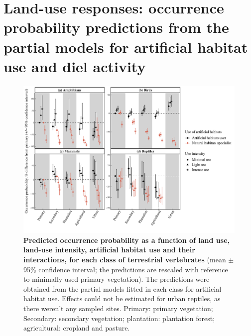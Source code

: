 \clearpage
\section{Land-use responses: occurrence probability predictions from the partial models for artificial habitat use and diel activity}

\begin{figure}[h!]
\centering
\includegraphics[scale=0.7]{Supporting/Chapter4/Figures/Partial_models_predictions/Specialisation}
\caption[Predicted occurrence probability as a function of land use, land-use intensity, artificial habitat use and their interactions in each class]{\textbf{Predicted occurrence probability as a function of land use, land-use intensity, artificial habitat use and their interactions, for each class of terrestrial vertebrates} (mean $\pm$95\% confidence interval; the predictions are rescaled with reference to minimally-used primary vegetation). The predictions were obtained from the partial models fitted in each class for artificial habitat use. Effects could not be estimated for urban reptiles, as there weren't any sampled sites. Primary: primary vegetation; Secondary: secondary vegetation; plantation: plantation forest; agricultural: cropland and pasture.}
\label{SI_4_Figure10}
\end{figure}

